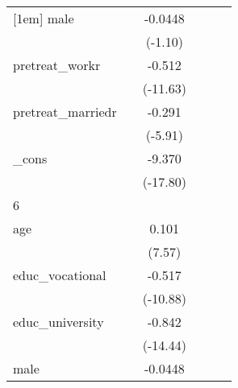 {\begin{tabular}{l*{5}{c}}
[1em]
male        &                     &     -0.0448         &                     &                     &                     \\
            &                     &     (-1.10)         &                     &                     &                     \\
[1em]
pretreat\_workr&                     &      -0.512\sym{***}&                     &                     &                     \\
            &                     &    (-11.63)         &                     &                     &                     \\
[1em]
pretreat\_marriedr&                     &      -0.291\sym{***}&                     &                     &                     \\
            &                     &     (-5.91)         &                     &                     &                     \\
[1em]
\_cons      &                     &      -9.370\sym{***}&                     &                     &                     \\
            &                     &    (-17.80)         &                     &                     &                     \\
\hline
6           &                     &                     &                     &                     &                     \\
age         &                     &       0.101\sym{***}&                     &                     &                     \\
            &                     &      (7.57)         &                     &                     &                     \\
[1em]
educ\_vocational&                     &      -0.517\sym{***}&                     &                     &                     \\
            &                     &    (-10.88)         &                     &                     &                     \\
[1em]
educ\_university&                     &      -0.842\sym{***}&                     &                     &                     \\
            &                     &    (-14.44)         &                     &                     &                     \\
[1em]
male        &                     &     -0.0448         &                     &                     &                     \\

\end{tabular}}
